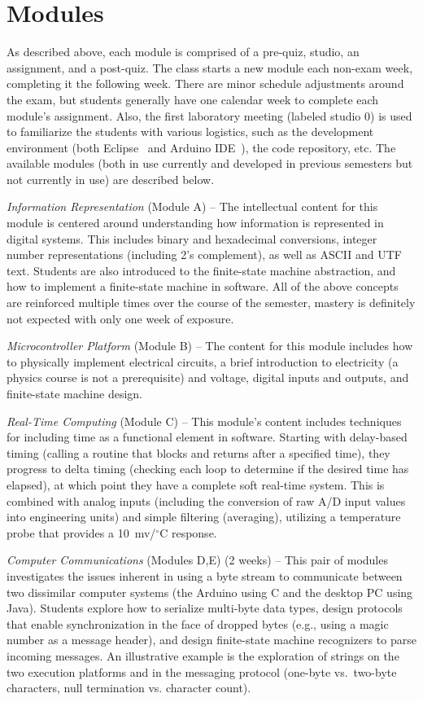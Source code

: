 \section{Modules}
\label{sec:weeks}

As described above, each module is comprised of a pre-quiz, studio,
an assignment, and a post-quiz.  The class starts a new module each
non-exam week, completing it the following week. There are minor schedule
adjustments around the exam, but students generally have one calendar week
to complete each module's assignment.
Also, the first laboratory meeting (labeled studio 0) is used to familiarize
the students with various logistics, such as the development environment
(both Eclipse~\cite{eclipse} and Arduino IDE~\cite{arduino}),
the code repository, etc.
The available modules
(both in use currently and developed in previous semesters but not
currently in use) are described below.

\emph{Information Representation} (Module A) --
The intellectual content for this module is centered around understanding
how information is represented in digital systems. This includes binary and
hexadecimal conversions, integer
number representations (including 2's complement), as well as
ASCII and UTF text.
Students are also introduced to the finite-state machine abstraction,
and how to implement a finite-state machine in software.
All of the above concepts are reinforced multiple times over the course
of the semester, mastery is definitely not expected with only one week
of exposure.

\emph{Microcontroller Platform} (Module B) --
The content for this module includes how to physically implement electrical
circuits, a brief introduction to electricity (a physics course is not a
prerequisite) and voltage, digital inputs and outputs, and finite-state
machine design.

\emph{Real-Time Computing} (Module C) --
This module's content includes techniques for including time as a functional
element in software. Starting with delay-based timing (calling a routine
that blocks and returns after a specified time), they progress to delta
timing (checking each loop to determine if the desired time has elapsed),
at which point they have a complete soft real-time system.
This is combined with analog inputs (including the conversion of raw A/D
input values into engineering units) and simple filtering (averaging),
utilizing a temperature probe that provides a 10~mv/$^\circ$C response.

\emph{Computer Communications} (Modules D,E) (2 weeks) --
This pair of modules investigates the issues inherent in using a byte stream
to communicate between two dissimilar computer systems (the Arduino using C
and the desktop PC using Java).  Students explore how
to serialize multi-byte data types, design protocols that enable synchronization
in the face of dropped bytes (e.g., using a magic number as a message header),
and design finite-state machine recognizers to parse incoming messages.
An illustrative example is the exploration of strings on the two execution
platforms and in the messaging protocol (one-byte vs.~two-byte characters,
null termination vs. character count).

